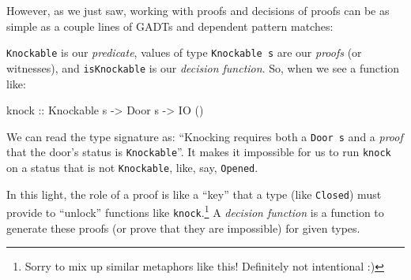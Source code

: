 \documentclass[]{article}
\newenvironment{Shaded}{}{}
\newcommand{\DataTypeTok}[1]{\textcolor[rgb]{0.56,0.13,0.00}{#1}}
\newcommand{\FunctionTok}[1]{\textcolor[rgb]{0.02,0.16,0.49}{#1}}
\newcommand{\KeywordTok}[1]{\textcolor[rgb]{0.00,0.44,0.13}{\textbf{#1}}}
\newcommand{\NormalTok}[1]{#1}
\newcommand{\OtherTok}[1]{\textcolor[rgb]{0.00,0.44,0.13}{#1}}
\begin{document}
However, as we just saw, working with proofs and decisions of proofs can be as
simple as a couple lines of GADTs and dependent pattern matches:

\begin{Shaded}
\end{Shaded}

\texttt{Knockable} is our \emph{predicate}, values of type \texttt{Knockable\ s}
are our \emph{proofs} (or witnesses), and \texttt{isKnockable} is our
\emph{decision function}. So, when we see a function like:

\begin{Shaded}
\begin{Highlighting}[]
\OtherTok{knock ::} \DataTypeTok{Knockable}\NormalTok{ s }\OtherTok{->} \DataTypeTok{Door}\NormalTok{ s }\OtherTok{->} \DataTypeTok{IO}\NormalTok{ ()}
\end{Highlighting}
\end{Shaded}

We can read the type signature as: ``Knocking requires both a \texttt{Door\ s}
and a \emph{proof} that the door's status is \texttt{Knockable}''. It makes it
impossible for us to run \texttt{knock} on a status that is not
\texttt{Knockable}, like, say, \texttt{\textquotesingle{}Opened}.

In this light, the role of a proof is like a ``key'' that a type (like
\texttt{\textquotesingle{}Closed}) must provide to ``unlock'' functions like
\texttt{knock}.\footnote{Sorry to mix up similar metaphors like this! Definitely
  not intentional :)} A \emph{decision function} is a function to generate these
proofs (or prove that they are impossible) for given types.
\end{document}
